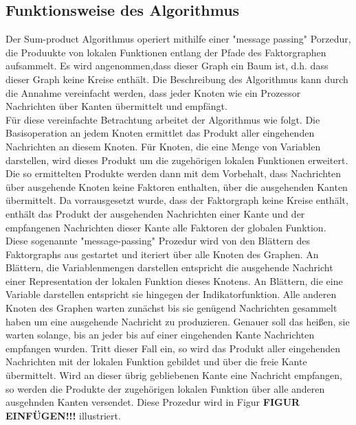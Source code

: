 \documentclass[12pt,a4paper]{scrartcl}
\numberwithin{equation}{section}
\begin{document}
\subsection{Funktionsweise des Algorithmus}

Der Sum-product Algorithmus operiert mithilfe einer "message passing" Porzedur, die Produukte von lokalen 
Funktionen entlang der Pfade des Faktorgraphen aufsammelt. Es wird angenommen,dass dieser Graph ein Baum ist, d.h.
dass dieser Graph keine Kreise enthält. Die Beschreibung des Algorithmus kann durch die Annahme vereinfacht werden, dass jeder Knoten wie ein
Prozessor Nachrichten über Kanten übermittelt und empfängt. \\

Für diese vereinfachte Betrachtung arbeitet der Algorithmus wie folgt. Die Basisoperation an jedem Knoten ermittlet
das Produkt aller eingehenden Nachrichten an diesem Knoten. Für Knoten, die eine Menge von Variablen darstellen, wird dieses Produkt
um die zugehörigen lokalen Funktionen erweitert. Die so ermittelten Produkte werden dann mit dem Vorbehalt, dass
Nachrichten über ausgehende Knoten keine Faktoren enthalten, über die ausgehenden Kanten übermittelt. Da vorrausgesetzt
wurde, dass der Faktorgraph keine Kreise enthält, enthält das Produkt der ausgehenden Nachrichten einer Kante und der empfangenen
Nachrichten dieser Kante alle Faktoren der globalen Funktion. \\

Diese sogenannte "message-passing" Prozedur wird von den Blättern des Faktorgraphs aus gestartet und iteriert über alle
Knoten des Graphen. An Blättern, die Variablenmengen darstellen entspricht die ausgehende Nachricht einer Representation der lokalen 
Funktion dieses Knotens. An Blättern, die eine Variable darstellen entspricht sie hingegen der Indikatorfunktion.
Alle anderen Knoten des Graphen warten zunächst bis sie genügend Nachrichten gesammelt haben um eine ausgehende 
Nachricht zu produzieren. Genauer soll das heißen, sie warten solange, bis an jeder bis auf einer eingehenden Kante Nachrichten
empfangen wurden. Tritt dieser Fall ein, so wird das Produkt aller eingehenden Nachrichten mit der lokalen Funktion gebildet und über die freie Kante übermittelt.
Wird an dieser übrig gebliebenen Kante eine Nachricht empfangen, so werden die Produkte der zugehörigen lokalen Funktion über alle
anderen ausgehnden Kanten versendet. Diese Prozedur wird in Figur \textbf{FIGUR EINFÜGEN!!!} illustriert.\\
\end{document}
